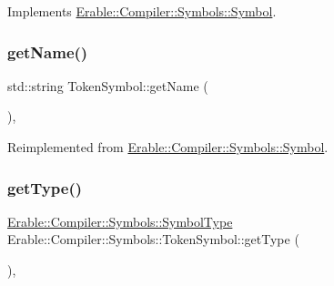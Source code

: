 Implements \mbox{\hyperlink{class_erable_1_1_compiler_1_1_symbols_1_1_symbol_ad9df550a90d6821b73291a241044c163}{Erable\+::\+Compiler\+::\+Symbols\+::\+Symbol}}.

\mbox{\label{class_erable_1_1_compiler_1_1_symbols_1_1_token_symbol_a2d9a65967a330721741d7f13ec299745}} 
\subsubsection{\texorpdfstring{getName()}{getName()}}
{\footnotesize\ttfamily std\+::string Token\+Symbol\+::get\+Name (\begin{DoxyParamCaption}{ }\end{DoxyParamCaption})\hspace{0.3cm}{\ttfamily [override]}, {\ttfamily [virtual]}}



Reimplemented from \mbox{\hyperlink{class_erable_1_1_compiler_1_1_symbols_1_1_symbol_a71aeae736d2ec43f0880341d53bbcc2c}{Erable\+::\+Compiler\+::\+Symbols\+::\+Symbol}}.

\mbox{\label{class_erable_1_1_compiler_1_1_symbols_1_1_token_symbol_af74e0413d933d950bcf47d7ab568d20f}} 
\subsubsection{\texorpdfstring{getType()}{getType()}\hspace{0.1cm}{\footnotesize\ttfamily [1/2]}}
{\footnotesize\ttfamily \mbox{\hyperlink{namespace_erable_1_1_compiler_1_1_symbols_a3b60ec10cda0920ec4368128361b8320}{Erable\+::\+Compiler\+::\+Symbols\+::\+Symbol\+Type}} Erable\+::\+Compiler\+::\+Symbols\+::\+Token\+Symbol\+::get\+Type (\begin{DoxyParamCaption}{ }\end{DoxyParamCaption})\hspace{0.3cm}{\ttfamily [override]}, {\ttfamily [virtual]}}



